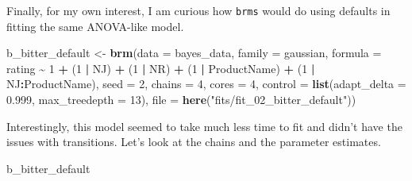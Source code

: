 \documentclass[
]{book}
\newenvironment{Shaded}{\begin{snugshade}}{\end{snugshade}}
\newcommand{\AttributeTok}[1]{\textcolor[rgb]{0.13,0.29,0.53}{#1}}
\newcommand{\DecValTok}[1]{\textcolor[rgb]{0.00,0.00,0.81}{#1}}
\newcommand{\FloatTok}[1]{\textcolor[rgb]{0.00,0.00,0.81}{#1}}
\newcommand{\FunctionTok}[1]{\textcolor[rgb]{0.13,0.29,0.53}{\textbf{#1}}}
\newcommand{\NormalTok}[1]{#1}
\newcommand{\OtherTok}[1]{\textcolor[rgb]{0.56,0.35,0.01}{#1}}
\newcommand{\SpecialCharTok}[1]{\textcolor[rgb]{0.81,0.36,0.00}{\textbf{#1}}}
\newcommand{\StringTok}[1]{\textcolor[rgb]{0.31,0.60,0.02}{#1}}
\begin{document}
Finally, for my own interest, I am curious how \texttt{brms} would do using defaults in fitting the same ANOVA-like model.

\begin{Shaded}
\begin{Highlighting}[]
\NormalTok{b\_bitter\_default }\OtherTok{\textless{}{-}}
  \FunctionTok{brm}\NormalTok{(}\AttributeTok{data =}\NormalTok{ bayes\_data,}
      \AttributeTok{family =}\NormalTok{ gaussian,}
      \AttributeTok{formula =}\NormalTok{ rating }\SpecialCharTok{\textasciitilde{}} \DecValTok{1} \SpecialCharTok{+}\NormalTok{ (}\DecValTok{1} \SpecialCharTok{|}\NormalTok{ NJ) }\SpecialCharTok{+}\NormalTok{ (}\DecValTok{1} \SpecialCharTok{|}\NormalTok{ NR) }\SpecialCharTok{+}\NormalTok{ (}\DecValTok{1} \SpecialCharTok{|}\NormalTok{ ProductName) }\SpecialCharTok{+}\NormalTok{ (}\DecValTok{1} \SpecialCharTok{|}\NormalTok{ NJ}\SpecialCharTok{:}\NormalTok{ProductName),}
      \AttributeTok{seed =} \DecValTok{2}\NormalTok{, }\AttributeTok{chains =} \DecValTok{4}\NormalTok{, }\AttributeTok{cores =} \DecValTok{4}\NormalTok{, }\AttributeTok{control =} \FunctionTok{list}\NormalTok{(}\AttributeTok{adapt\_delta =} \FloatTok{0.999}\NormalTok{, }\AttributeTok{max\_treedepth =} \DecValTok{13}\NormalTok{),}
      \AttributeTok{file =} \FunctionTok{here}\NormalTok{(}\StringTok{"fits/fit\_02\_bitter\_default"}\NormalTok{))}
\end{Highlighting}
\end{Shaded}

Interestingly, this model seemed to take much less time to fit and didn't have the issues with transitions. Let's look at the chains and the parameter estimates.

\begin{Shaded}
\begin{Highlighting}[]
\NormalTok{b\_bitter\_default}
\end{Highlighting}
\end{Shaded}
\end{document}
